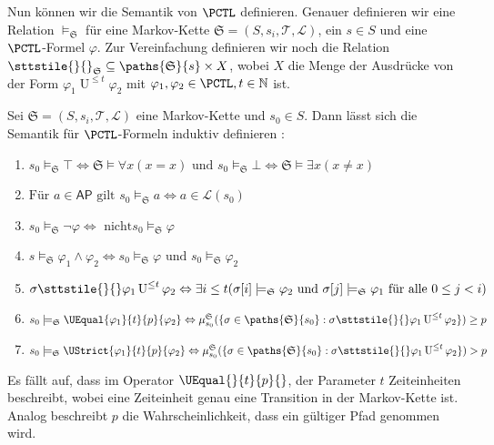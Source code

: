 Nun können wir die Semantik von $\PCTL$ definieren. Genauer definieren wir eine Relation $\models_\mathfrak{S}$ für eine Markov-Kette $\mathfrak{S}=(S,s_i,\mathcal{T},\mathcal{L})$, ein $s\in S$ und eine $\PCTL$-Formel $\varphi$. 
Zur Vereinfachung definieren wir noch die Relation $\sttstile{}{}_\mathfrak{S} \subseteq \paths{\mathfrak{S}}{s} \times X$, wobei $X$ die Menge der Ausdrücke von der Form $\varphi_1 \operatorname{U}^{\leq t}\varphi_2$ mit $\varphi_1,\varphi_2 \in \PCTL, t\in \mathbb{N}$ ist.  

\begin{definition}
	Sei $\mathfrak{S}=(S,s_i,\mathcal{T},\mathcal{L})$ eine Markov-Kette und $s_0\in S$. Dann lässt sich die Semantik für $\PCTL$-Formeln induktiv definieren \cite{hansson1994logic}:
	\begin{enumerate}
		\item $s_0 \models_\mathfrak{S} \top \Leftrightarrow \mathfrak{S}\models \forall x(x=x)\text{ und }s_0\models_\mathfrak{S} \bot \Leftrightarrow \mathfrak{S}\models \exists x(x\neq x)$
		\item $\text{Für }a\in \mathsf{AP}\text{ gilt }s_0\models_\mathfrak{S} a \Leftrightarrow a\in \mathcal{L}(s_0)$
		\item $s_0 \models_\mathfrak{S}\neg \varphi \Leftrightarrow \text{ nicht} s_0\models_\mathfrak{S} \varphi$
		\item $s\models_\mathfrak{S} \varphi_1\land\varphi_2 \Leftrightarrow s_0\models_\mathfrak{S} \varphi \text{ und } s_0\models_\mathfrak{S} \varphi_2$
		\item $\sigma \sttstile{}{} \varphi_1\operatorname{U}^{\leq t}\varphi_2 \Leftrightarrow \exists i\leq t(\sigma[i]\models_\mathfrak{S} \varphi_2 \text{ und } \sigma[j]\models_\mathfrak{S} \varphi_1 \text{ für alle } 0 \leq j<i)$
		\item $s_0\models_\mathfrak{S} \UEqual{\varphi_1}{t}{p}{\varphi_2} \Leftrightarrow \mu^\mathfrak{S}_{s_0}(\{\sigma \in \paths{\mathfrak{S}}{s_0} : \sigma \sttstile{}{}\varphi_1\operatorname{U}^{\leq t}\varphi_2\})\geq p$
		\item $s_0\models_\mathfrak{S} \UStrict{\varphi_1}{t}{p}{\varphi_2} \Leftrightarrow \mu^\mathfrak{S}_{s_0}(\{\sigma \in \paths{\mathfrak{S}}{s_0} : \sigma \sttstile{}{}\varphi_1\operatorname{U}^{\leq t}\varphi_2\}) > p$
	\end{enumerate}
\end{definition}

Es fällt auf, dass im Operator $\UEqual{}{t}{p}{}$, der Parameter $t$  Zeiteinheiten beschreibt, wobei eine Zeiteinheit genau eine Transition in der Markov-Kette ist. Analog beschreibt $p$ die Wahrscheinlichkeit, dass ein gültiger Pfad \glqq genommen\grqq{} wird.

